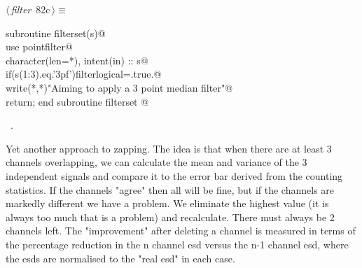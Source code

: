 \documentclass[10pt,a4paper,notitlepage]{article}
\begin{document}
\begin{flushleft} \small
\begin{minipage}{\linewidth}\label{scrap99}\raggedright\small
{} $\langle\,${\it filter}\nobreak\ {\footnotesize {82c}}$\,\rangle\equiv$
\vspace{-1ex}
\begin{list}{}{} \item
\mbox{}\verb@      subroutine filterset(s)@\\
\mbox{}\verb@      use pointfilter@\\
\mbox{}\verb@      character(len=*), intent(in) :: s@\\
\mbox{}\verb@      if(s(1:3).eq.'3pf')filterlogical=.true.@\\
\mbox{}\verb@      write(*,*)"Aiming to apply a 3 point median filter"@\\
\mbox{}\verb@      return; end subroutine filterset                                    @{\NWsep}
\end{list}
\vspace{-1.5ex}
\footnotesize
\begin{list}{}{\setlength{\itemsep}{-\parsep}\setlength{\itemindent}{-\leftmargin}}
\item \NWtxtMacroRefIn\ .

\item{}
\end{list}
\end{minipage}\vspace{4ex}
\end{flushleft}
Yet another approach to zapping. The idea is that when there are at least
3 channels overlapping, we can calculate the mean and variance of the 3
independent signals and compare it to the error bar derived from the counting
statistics. If the channels "agree" then all will be fine, but if the channels
are markedly different we have a problem. We eliminate the highest value (it
is always too much that is a problem) and recalculate. There must always be
2 channels left. The "improvement" after deleting a channel is measured in
terms of the percentage reduction in the n channel esd versus the n-1 channel
esd, where the esds are normalised to the "real esd" in each case.
\end{document}
